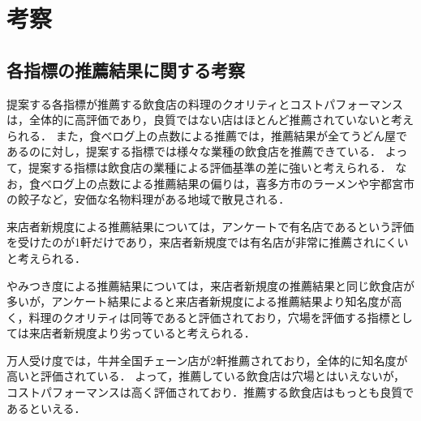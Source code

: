 \chapter{考察}

\label{chap:discussion}

\section{各指標の推薦結果に関する考察}
提案する各指標が推薦する飲食店の料理のクオリティとコストパフォーマンスは，全体的に高評価であり，良質ではない店はほとんど推薦されていないと考えられる．
また，食べログ上の点数による推薦では，推薦結果が全てうどん屋であるのに対し，提案する指標では様々な業種の飲食店を推薦できている．
よって，提案する指標は飲食店の業種による評価基準の差に強いと考えられる．
なお，食べログ上の点数による推薦結果の偏りは，喜多方市のラーメンや宇都宮市の餃子など，安価な名物料理がある地域で散見される．
\par
来店者新規度による推薦結果については，アンケートで有名店であるという評価を受けたのが1軒だけであり，来店者新規度では有名店が非常に推薦されにくいと考えられる．

やみつき度による推薦結果については，来店者新規度の推薦結果と同じ飲食店が多いが，アンケート結果によると来店者新規度による推薦結果より知名度が高く，料理のクオリティは同等であると評価されており，穴場を評価する指標としては来店者新規度より劣っていると考えられる．

万人受け度では，牛丼全国チェーン店が2軒推薦されており，全体的に知名度が高いと評価されている．
よって，推薦している飲食店は穴場とはいえないが，コストパフォーマンスは高く評価されており．推薦する飲食店はもっとも良質であるといえる．
